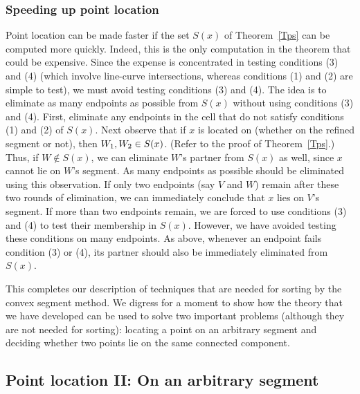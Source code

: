 \subsubsection{Speeding up point location}
\label{ss-speeeeed}

Point location can be made faster if the set $S(x)$ of Theorem~\ref{Tps} can be
computed more quickly.
Indeed, this is the only computation in the theorem that could be expensive.
Since the expense is concentrated in testing conditions (3) and (4) (which involve
line-curve intersections, whereas conditions (1) and (2) are simple to test),
we must avoid testing conditions (3) and (4).
The idea is to eliminate as many endpoints as possible from $S(x)$ without using
conditions (3) and (4).
First, eliminate any endpoints in the cell that do not satisfy conditions (1) and (2) 
of $S(x)$.
Next observe that if $x$ is located on \arc{\wo\wt}
(whether on the refined segment or not), then $\mbox{$W_{1}$},\mbox{$W_{2}$} \in S(x)$.
(Refer to the proof of Theorem~\ref{Tps}.)
Thus, if $W \not\in S(x)$, we can eliminate $W$'s partner from $S(x)$ as well,
since $x$ cannot lie on $W$'s segment.
As many endpoints as possible should be eliminated using this observation.
If only two endpoints (say $V$ and $W$) remain after these two rounds of elimination,
we can immediately conclude that $x$ lies on $V$'s segment.
If more than two endpoints remain, we are forced to use conditions (3) and (4) to test
their membership in $S(x)$.
However, we have avoided testing these conditions on many endpoints.
As above, whenever an endpoint fails condition (3) or (4), its partner should also be
immediately eliminated from $S(x)$.

This completes our description of techniques that are needed for sorting by 
the convex segment method.
We digress for a moment to show how the theory that we have developed can be used
to solve two important problems (although they are not needed for sorting):
locating a point on an arbitrary segment and deciding whether two points lie on the
same connected component.

\subsection{Point location II: On an arbitrary segment}
\label{sec-pII}


